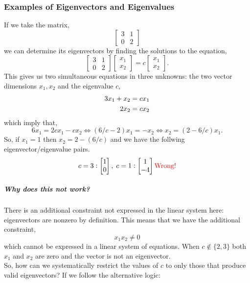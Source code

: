 \documentclass[MathsNotesBase.tex]{subfiles}
\begin{document}
{	 	\subsubsection{Examples of Eigenvectors and Eigenvalues}
	 	\begin{exe}
	 		\item{If we take the matrix,
	 			\[ 
		 			\begin{bmatrix}
		 			3 & 1\\
		 			0 & 2
		 			\end{bmatrix}
	 			\]
	 			we can determine its eigenvectors by finding the solutions to the equation,
	 			\[
	 			 	\begin{bmatrix}3 & 1\\0 & 2\end{bmatrix}\begin{bmatrix}x_1\\x_2\end{bmatrix} = c\begin{bmatrix}x_1\\x_2\end{bmatrix}.	 			 	
	 			\]
	 			This gives us two simultaneous equations in three unknowns: the two vector dimensions ${ x_1,x_2 }$ and the eigenvalue $c$,
	 			\begin{align*}
	 			&& 3x_1 + x_2 &= cx_1 \\
	 			&& 2x_2 &= cx_2 &\text{\scriptsize{}} \\
	 			\end{align*}
	 			which imply that,
	 			\[ 6x_1 = 2cx_1 - cx_2 \iff (6/c - 2)x_1 = -x_2 \iff x_2 = (2 - 6/c)x_1. \]
	 			So, if ${ x_1 = 1 }$ then ${ x_2 = 2 - (6/c) }$ and we have the follwing eigenvector/eigenvalue pairs.
	 			\[
	 				c=3: \begin{bmatrix}1\\0\end{bmatrix}, \; c=1: \begin{bmatrix}1\\-4\end{bmatrix} \wrong
	 			\]
	 			\subparagraph{Why does this not work?} There is an additional constraint not expressed in the linear system here: eigenvectors are nonzero by definition. This means that we have the additional constraint,
	 			\[ x_1x_2 \neq 0 \]
	 			which cannot be expressed in a linear system of equations. When ${ c \not\in \{2,3\} }$ both $x_1$ and $x_2$ are zero and the vector is not an eigenvector.\\
	 			So, how can we systematically restrict the values of $c$ to only those that produce valid eigenvectors? If we follow the alternative logic:
}
\end{exe}}
\end{document}
